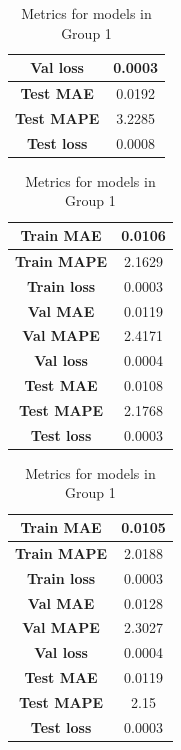 \begin{enumerate}
\begin{table}[H]
\begin{minipage}{0.45\textwidth}
\begin{tabular}{|c|c|}
				\hline
				\textbf{Val loss}   & 0.0003 \\
				\hline
				\textbf{Test MAE}   & 0.0192 \\
				\hline
				\textbf{Test MAPE}  & 3.2285 \\
				\hline
				\textbf{Test loss}  & 0.0008 \\
				\hline
			\end{tabular}
			\label{m12}
		\end{minipage}
		\begin{minipage}{0.45\textwidth}
			\centering
			\begin{tabular}{|c|c|}
				\hline
				\textbf{Train MAE}  & 0.0106 \\
				\hline
				\textbf{Train MAPE} & 2.1629 \\
				\hline
				\textbf{Train loss} & 0.0003 \\
				\hline
				\textbf{Val MAE}    & 0.0119 \\
				\hline
				\textbf{Val MAPE}   & 2.4171 \\
				\hline
				\textbf{Val loss}   & 0.0004 \\
				\hline
				\textbf{Test MAE}   & 0.0108 \\
				\hline
				\textbf{Test MAPE}  & 2.1768 \\
				\hline
				\textbf{Test loss}  & 0.0003 \\
				\hline
			\end{tabular}
			\label{m13}
		\end{minipage}
		\begin{minipage}{0.45\textwidth}
			\centering
			\begin{tabular}{|c|c|}
				\hline
				\textbf{Train MAE}  & 0.0105 \\
				\hline
				\textbf{Train MAPE} & 2.0188 \\
				\hline
				\textbf{Train loss} & 0.0003 \\
				\hline
				\textbf{Val MAE}    & 0.0128 \\
				\hline
				\textbf{Val MAPE}   & 2.3027 \\
				\hline
				\textbf{Val loss}   & 0.0004 \\
				\hline
				\textbf{Test MAE}   & 0.0119 \\
				\hline
				\textbf{Test MAPE}  & 2.15   \\
				\hline
				\textbf{Test loss}  & 0.0003 \\
				\hline
			\end{tabular}
			\label{m14}
		\end{minipage}
		\caption{Metrics for models in Group 1}
	\end{table}
\end{enumerate}

